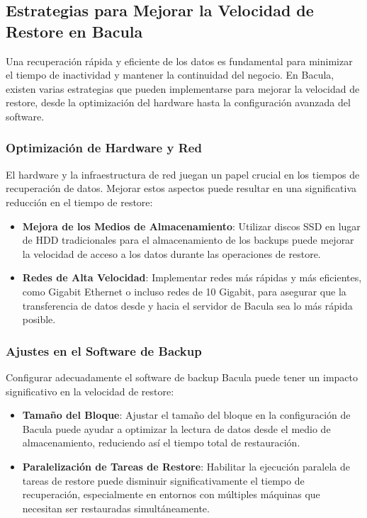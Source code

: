 \subsection{Estrategias para Mejorar la Velocidad de Restore en Bacula}

Una recuperación rápida y eficiente de los datos es fundamental para minimizar el tiempo de inactividad y mantener la continuidad del negocio. En Bacula, existen varias estrategias que pueden implementarse para mejorar la velocidad de restore, desde la optimización del hardware hasta la configuración avanzada del software.

\subsubsection{Optimización de Hardware y Red}

El hardware y la infraestructura de red juegan un papel crucial en los tiempos de recuperación de datos. Mejorar estos aspectos puede resultar en una significativa reducción en el tiempo de restore:

\begin{itemize}
    \item \textbf{Mejora de los Medios de Almacenamiento}: Utilizar discos SSD en lugar de HDD tradicionales para el almacenamiento de los backups puede mejorar la velocidad de acceso a los datos durante las operaciones de restore.
    \item \textbf{Redes de Alta Velocidad}: Implementar redes más rápidas y más eficientes, como Gigabit Ethernet o incluso redes de 10 Gigabit, para asegurar que la transferencia de datos desde y hacia el servidor de Bacula sea lo más rápida posible.
\end{itemize}

\subsubsection{Ajustes en el Software de Backup}

Configurar adecuadamente el software de backup Bacula puede tener un impacto significativo en la velocidad de restore:

\begin{itemize}
    \item \textbf{Tamaño del Bloque}: Ajustar el tamaño del bloque en la configuración de Bacula puede ayudar a optimizar la lectura de datos desde el medio de almacenamiento, reduciendo así el tiempo total de restauración.
    \item \textbf{Paralelización de Tareas de Restore}: Habilitar la ejecución paralela de tareas de restore puede disminuir significativamente el tiempo de recuperación, especialmente en entornos con múltiples máquinas que necesitan ser restauradas simultáneamente.
\end{itemize}

